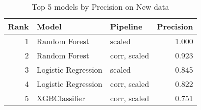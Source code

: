 \begin{table}[!htb]
\centering
\begin{tabular}{rllr}
\toprule
Rank & Model & Pipeline & Precision \\
\midrule
1 & Random Forest & scaled & 1.000 \\
2 & Random Forest & corr, scaled & 0.923 \\
3 & Logistic Regression & scaled & 0.845 \\
4 & Logistic Regression & corr, scaled & 0.822 \\
5 & XGBClassifier & corr, scaled & 0.751 \\
\bottomrule
\end{tabular}
\caption{Top 5 models by Precision on New data}
\label{table-top-5-precision-new}
\end{table}
